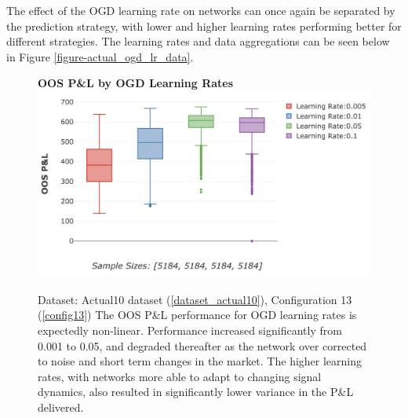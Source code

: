 \documentclass[a4paper,11pt,oneside]{article}
\theoremstyle{plain}
\theoremstyle{definition}
\begin{document}
	The effect of the OGD learning rate on networks can once again be separated by the prediction strategy, with lower and higher learning rates performing better for different strategies. The learning rates and data aggregations can be seen below in Figure \ref{figure-actual_ogd_lr_data}.\newline
	
	\begin{figure}[H]
		\textbf{OOS P\&L by OGD Learning Rates}
		\centering
		\includegraphics[scale=0.4]{images/results/8_2_determinants/actual_ogd_lr.png}
		\caption[OOS P\&L by OGD Learning Rates]
		{Dataset: Actual10 dataset (\ref{dataset_actual10}), Configuration 13 (\ref{config13})
			\newline The OOS P\&L performance for OGD learning rates is expectedly non-linear. Performance increased significantly from 0.001 to 0.05, and degraded thereafter as the network over corrected to noise and short term changes in the market. The higher learning rates, with networks more able to adapt to changing signal dynamics, also resulted in significantly lower variance in the P\&L delivered. }
		\label{figure-actual_ogd_lr}
	\end{figure}
\end{document}

